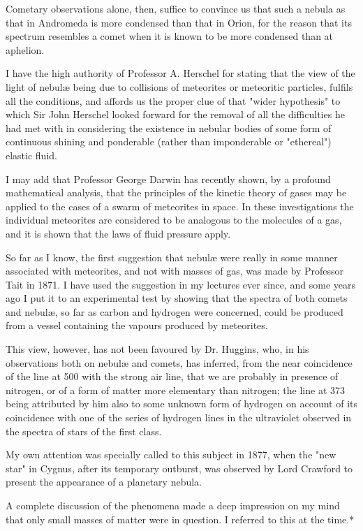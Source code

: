 \documentclass[a4paper, 12pt, oneside, polutonikogreek, english]{article}
\begin{document}
Cometary observations alone, then, suffice to convince us that such a nebula as that in Andromeda is more condensed than that in Orion, for the reason that its spectrum resembles a comet when it is known to be more condensed than at aphelion.

I have the high authority of Professor A. Herschel for stating that the view of the light of nebulæ being due to collisions of meteorites or meteoritic particles, fulfils all the conditions, and affords us the proper clue of that "wider hypothesis" to which Sir John Herschel looked forward for the removal of all the difficulties he had met with in considering the existence in nebular bodies of some form of continuous shining and ponderable (rather than imponderable or "ethereal") elastic fluid.

I may add that Professor George Darwin has recently shown, by a profound mathematical analysis, that the principles of the kinetic theory of gases may be applied to the cases of a swarm of meteorites in space. In these investigations the individual meteorites are considered to be analogous to the molecules of a gas, and it is shown that the laws of fluid pressure apply.

So far as I know, the first suggestion that nebulæ were really in some manner associated with meteorites, and not with masses of gas, was made by Professor Tait in 1871. I have used the suggestion in my lectures ever since, and some years ago I put it to an experimental test by showing that the spectra of both comets and nebulæ, so far as carbon and hydrogen were concerned, could be produced from a vessel containing the vapours produced by meteorites.

This view, however, has not been favoured by Dr. Huggins, who, in his observations both on nebulæ and comets, has inferred, from the near coincidence of the line at 500 with the strong air line, that we are probably in presence of nitrogen, or of a form of matter more elementary than nitrogen; the line at 373 being attributed by him also to some unknown form of hydrogen on account of its coincidence with one of the series of hydrogen lines in the ultraviolet observed in the spectra of stars of the first class.

My own attention was specially called to this subject in 1877, when the "new star" in Cygnus, after its temporary outburst, was observed by Lord Crawford to present the appearance of a planetary nebula.

A complete discussion of the phenomena made a deep impression on my mind that only small masses of matter were in question. I referred to this at the time.*
\end{document}
